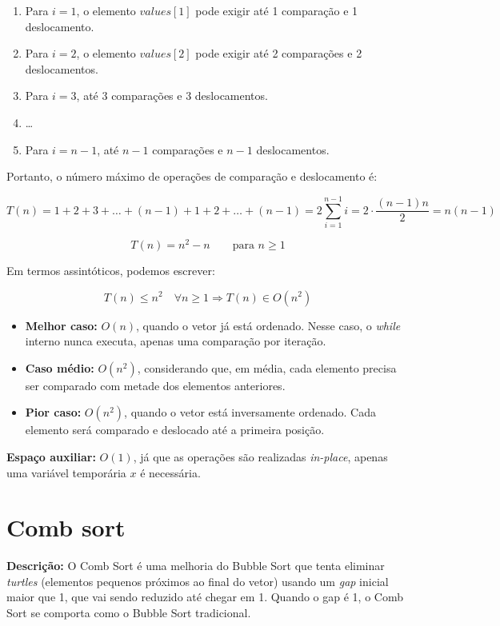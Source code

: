 \begin{enumerate}
    \item Para $i = 1$, o elemento $values[1]$ pode exigir até 1 comparação e 1 deslocamento.
    \item Para $i = 2$, o elemento $values[2]$ pode exigir até 2 comparações e 2 deslocamentos.
    \item Para $i = 3$, até 3 comparações e 3 deslocamentos.
    \item \dots
    \item Para $i = n-1$, até $n-1$ comparações e $n-1$ deslocamentos.
\end{enumerate}

Portanto, o número máximo de operações de comparação e deslocamento é:

\[
T(n) = 1 + 2 + 3 + \dots + (n-1) + 1 + 2 + \dots + (n-1) = 2 \sum_{i=1}^{n-1} i = 2 \cdot \frac{(n-1)n}{2} = n(n-1)
\]

\[
T(n) = n^2 - n \quad\quad \text{para } n \ge 1
\]

Em termos assintóticos, podemos escrever:

\[
T(n) \le n^2 \quad \forall n \ge 1 \Rightarrow T(n) \in O(n^2)
\]

\begin{itemize}
    \item \textbf{Melhor caso:} $O(n)$, quando o vetor já está ordenado. Nesse caso, o \textit{while} interno nunca executa, apenas uma comparação por iteração.
    
    \item \textbf{Caso médio:} $O(n^2)$, considerando que, em média, cada elemento precisa ser comparado com metade dos elementos anteriores.
    
    \item \textbf{Pior caso:} $O(n^2)$, quando o vetor está inversamente ordenado. Cada elemento será comparado e deslocado até a primeira posição.
\end{itemize}

\noindent\textbf{Espaço auxiliar:} $O(1)$, já que as operações são realizadas \textit{in-place}, apenas uma variável temporária $x$ é necessária. 

\section{Comb sort}
\textbf{Descrição:} O Comb Sort é uma melhoria do Bubble Sort que tenta eliminar \textit{turtles} (elementos pequenos próximos ao final do vetor) usando um \textit{gap} inicial maior que 1, que vai sendo reduzido até chegar em 1. Quando o gap é 1, o Comb Sort se comporta como o Bubble Sort tradicional.

